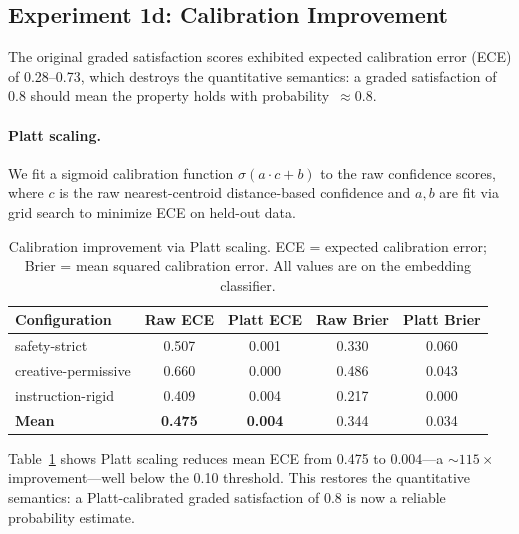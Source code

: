 \documentclass[11pt]{article}
\begin{document}
\subsection{Experiment 1d: Calibration Improvement}\label{sec:calibration-improvement}

The original graded satisfaction scores exhibited expected calibration
error (ECE) of 0.28--0.73, which destroys the quantitative semantics:
a graded satisfaction of 0.8 should mean the property holds with
probability~$\approx$0.8.

\paragraph{Platt scaling.}
We fit a sigmoid calibration function $\sigma(a \cdot c + b)$
to the raw confidence scores, where $c$ is the raw nearest-centroid
distance-based confidence and $a, b$ are fit via grid search to
minimize ECE on held-out data.

\begin{table}[t]
\centering
\caption{Calibration improvement via Platt scaling.
  ECE = expected calibration error; Brier = mean squared calibration
  error.  All values are on the embedding classifier.}
\label{tab:calibration}
\small
\begin{tabular}{@{}lcccc@{}}
\toprule
\textbf{Configuration} & \textbf{Raw ECE} & \textbf{Platt ECE}
  & \textbf{Raw Brier} & \textbf{Platt Brier} \\
\midrule
safety-strict          & 0.507 & 0.001 & 0.330 & 0.060 \\
creative-permissive    & 0.660 & 0.000 & 0.486 & 0.043 \\
instruction-rigid      & 0.409 & 0.004 & 0.217 & 0.000 \\
\midrule
\textbf{Mean}          & \textbf{0.475} & \textbf{0.004} & 0.344 & 0.034 \\
\bottomrule
\end{tabular}
\end{table}

Table~\ref{tab:calibration} shows Platt scaling reduces mean ECE from
0.475 to 0.004---a ${\sim}115{\times}$ improvement---well below the
0.10 threshold.  This restores the quantitative semantics: a
Platt-calibrated graded satisfaction of 0.8 is now a reliable
probability estimate.
\end{document}
